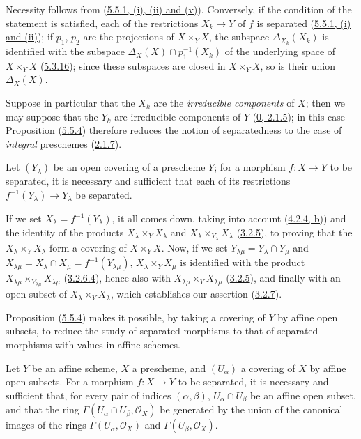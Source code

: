 Necessity follows from
(\hyperref[I.5.5.1]{5.5.1, (i), (ii) and (v)}). Conversely, if the
condition of the statement is satisfied, each of the restrictions $X_k\to Y$
of $f$ is separated (\hyperref[I.5.5.1]{5.5.1, (i) and (ii)}); if $p_1$,
$p_2$ are the projections of $X\times_Y X$, the subspace
$\Delta_{X_k}(X_k)$ is identified with the subspace
$\Delta_X(X)\cap p_1^{-1}(X_k)$ of the underlying space of
$X\times_Y X$ (\hyperref[I.5.3.16]{5.3.16}); since these subspaces are
closed in $X\times_Y X$, so is their union $\Delta_X(X)$.

Suppose in particular that the $X_k$ are the
\emph{irreducible components} of $X$; then we may suppose that the $Y_k$
are irreducible components of $Y$
(\hyperref[0.2.1.5]{0, 2.1.5}); in this case Proposition
(\hyperref[I.5.5.4]{5.5.4}) therefore reduces the notion of separatedness
to the case of \emph{integral} preschemes (\hyperref[I.2.1.7]{2.1.7}).


\begin{proposition}[5.5.5]
\label{I.5.5.5}
Let $(Y_\lambda)$ be an open covering of a prescheme $Y$; for a
morphism $f:X\to Y$ to be separated, it is necessary and sufficient that each
of its restrictions $f^{-1}(Y_\lambda)\to Y_\lambda$ be separated.
\end{proposition}

If we set $X_\lambda=f^{-1}(Y_\lambda)$, it all comes down, taking into
account (\hyperref[I.4.2.4]{4.2.4, b)}) and the identity of the products
$X_\lambda\times_Y X_\lambda$ and
$X_\lambda\times_{Y_\lambda}X_\lambda$
(\hyperref[I.3.2.5]{3.2.5}), to proving that the
$X_\lambda\times_Y X_\lambda$ form a covering of $X\times_Y X$. Now,
if we set $Y_{\lambda\mu}=Y_\lambda\cap Y_\mu$ and
$X_{\lambda\mu}=X_\lambda\cap X_\mu=f^{-1}(Y_{\lambda\mu})$,
$X_\lambda\times_Y X_\mu$ is identified with the product
$X_{\lambda\mu}\times_{Y_{\lambda\mu}}X_{\lambda\mu}$
(\hyperref[I.3.2.6.4]{3.2.6.4}), hence also with
$X_{\lambda\mu}\times_Y X_{\lambda\mu}$
(\hyperref[I.3.2.5]{3.2.5}), and finally with an open subset of
$X_\lambda\times_Y X_\lambda$, which establishes our assertion
(\hyperref[I.3.2.7]{3.2.7}).

Proposition (\hyperref[I.5.5.4]{5.5.4}) makes it possible, by taking a
covering of $Y$ by affine open subsets, to reduce the study of separated
morphisms to that of separated morphisms with values in affine schemes.

\begin{proposition}[5.5.6]
\label{I.5.5.6}
Let $Y$ be an affine scheme, $X$ a prescheme, and $(U_\alpha)$ a covering of
$X$ by affine open subsets. For a morphism $f:X\to Y$ to be separated, it
is necessary and sufficient that, for every pair of indices $(\alpha,\beta)$,
$U_\alpha\cap U_\beta$ be an affine open subset, and that the ring
$\Gamma(U_\alpha\cap U_\beta,\mathscr{O}_X)$ be generated by the union of the
canonical images of the rings $\Gamma(U_\alpha,\mathscr{O}_X)$ and
$\Gamma(U_\beta,\mathscr{O}_X)$.
\end{proposition}

